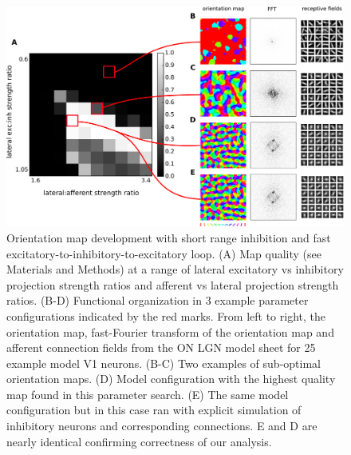 \documentclass[utf8]{frontiersSCNS}
\begin{document}
\begin{figure}[htpb!] 
\centering
\includegraphics[width=16cm]{./SVG/Figure1/figure1.png}
\caption{Orientation map development with short range inhibition and fast excitatory-to-inhibitory-to-excitatory loop. (A) Map quality (see Materials and Methods) at a range of 
lateral excitatory vs inhibitory projection strength ratios and afferent vs lateral projection strength ratios. (B-D) Functional organization in 3 example parameter configurations 
indicated by the red marks. From left to right, the orientation map, fast-Fourier transform of the orientation map and afferent connection fields from the ON LGN model sheet for 25 example model V1 neurons. 
(B-C) Two examples of sub-optimal orientation maps. (D) Model configuration with the highest quality map found in this parameter search. 
(E) The same model configuration but in this case ran with explicit simulation of inhibitory neurons and corresponding connections. E and D are nearly identical confirming correctness of our analysis.
}
\label{fig:figure1}
\end{figure} 
\end{document}
